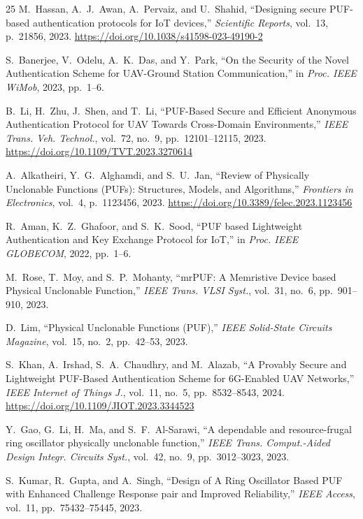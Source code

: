 \documentclass[11pt,a4paper]{article}
\begin{document}
\begin{thebibliography}{25}
M.~Hassan, A.~J.~Awan, A.~Pervaiz, and U.~Shahid, ``Designing secure PUF-based authentication protocols for IoT devices,'' \textit{Scientific Reports}, vol.~13, p.~21856, 2023. \url{https://doi.org/10.1038/s41598-023-49190-2}

S.~Banerjee, V.~Odelu, A.~K.~Das, and Y.~Park, ``On the Security of the Novel Authentication Scheme for UAV-Ground Station Communication,'' in \textit{Proc. IEEE WiMob}, 2023, pp.~1--6.

B.~Li, H.~Zhu, J.~Shen, and T.~Li, ``PUF-Based Secure and Efficient Anonymous Authentication Protocol for UAV Towards Cross-Domain Environments,'' \textit{IEEE Trans. Veh. Technol.}, vol.~72, no.~9, pp.~12101--12115, 2023. \url{https://doi.org/10.1109/TVT.2023.3270614}

A.~Alkatheiri, Y.~G.~Alghamdi, and S.~U.~Jan, ``Review of Physically Unclonable Functions (PUFs): Structures, Models, and Algorithms,'' \textit{Frontiers in Electronics}, vol.~4, p.~1123456, 2023. \url{https://doi.org/10.3389/felec.2023.1123456}

R.~Aman, K.~Z.~Ghafoor, and S.~K.~Sood, ``PUF based Lightweight Authentication and Key Exchange Protocol for IoT,'' in \textit{Proc. IEEE GLOBECOM}, 2022, pp.~1--6.

M.~Rose, T.~Moy, and S.~P.~Mohanty, ``mrPUF: A Memristive Device based Physical Unclonable Function,'' \textit{IEEE Trans. VLSI Syst.}, vol.~31, no.~6, pp.~901--910, 2023.

D.~Lim, ``Physical Unclonable Functions (PUF),'' \textit{IEEE Solid-State Circuits Magazine}, vol.~15, no.~2, pp.~42--53, 2023.

S.~Khan, A.~Irshad, S.~A.~Chaudhry, and M.~Alazab, ``A Provably Secure and Lightweight PUF-Based Authentication Scheme for 6G-Enabled UAV Networks,'' \textit{IEEE Internet of Things J.}, vol.~11, no.~5, pp.~8532--8543, 2024. \url{https://doi.org/10.1109/JIOT.2023.3344523}

Y.~Gao, G.~Li, H.~Ma, and S.~F.~Al-Sarawi, ``A dependable and resource-frugal ring oscillator physically unclonable function,'' \textit{IEEE Trans. Comput.-Aided Design Integr. Circuits Syst.}, vol.~42, no.~9, pp.~3012--3023, 2023.

S.~Kumar, R.~Gupta, and A.~Singh, ``Design of A Ring Oscillator Based PUF with Enhanced Challenge Response pair and Improved Reliability,'' \textit{IEEE Access}, vol.~11, pp.~75432--75445, 2023.


\end{thebibliography}
\end{document}
